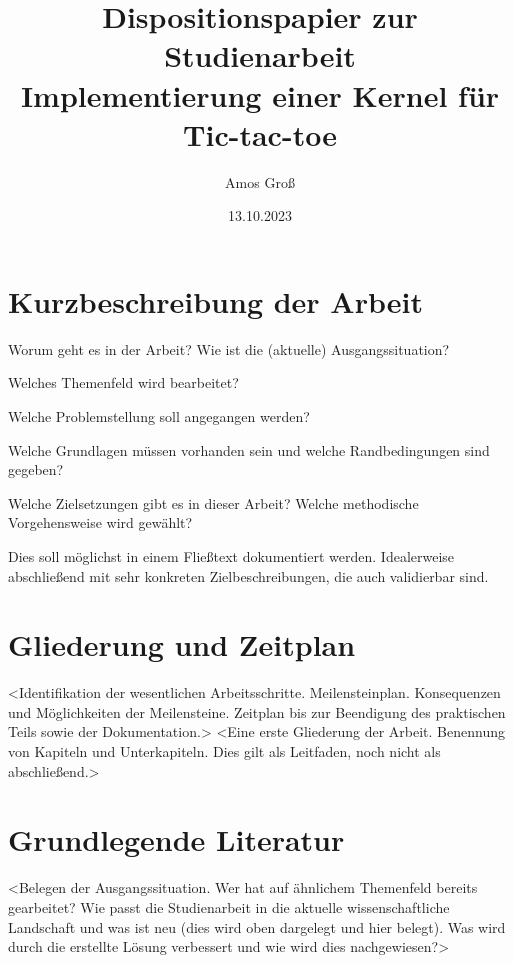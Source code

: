 \documentclass{scrartcl}
\title{Dispositionspapier zur Studienarbeit\\Implementierung einer Kernel für Tic-tac-toe}
\author{ Amos Groß }
\date{13.10.2023}
\begin{document}
\maketitle

\section{Kurzbeschreibung der Arbeit}
Worum geht es in der Arbeit? 
Wie ist die (aktuelle) Ausgangssituation? 


Welches Themenfeld wird bearbeitet? 

Welche Problemstellung soll angegangen werden? 

Welche Grundlagen müssen vorhanden sein und welche Randbedingungen sind gegeben? 

Welche Zielsetzungen gibt es in dieser Arbeit? 
Welche methodische Vorgehensweise wird gewählt?  

Dies soll möglichst in einem Fließtext dokumentiert werden. Idealerweise abschließend mit sehr konkreten Zielbeschreibungen, die auch validierbar sind.


\section{Gliederung und Zeitplan}
<Identifikation der wesentlichen Arbeitsschritte. Meilensteinplan. Konsequenzen
und Möglichkeiten der Meilensteine. Zeitplan bis zur Beendigung des praktischen
Teils sowie der Dokumentation.> <Eine erste Gliederung der Arbeit. Benennung von
Kapiteln und Unterkapiteln. Dies gilt als Leitfaden, noch nicht als abschließend.>

\section{Grundlegende Literatur}
<Belegen der Ausgangssituation. Wer hat auf ähnlichem Themenfeld bereits
gearbeitet? Wie passt die Studienarbeit in die aktuelle wissenschaftliche
Landschaft und was ist neu (dies wird oben dargelegt und hier belegt). Was wird
durch die erstellte Lösung verbessert und wie wird dies nachgewiesen?>
\end{document}
